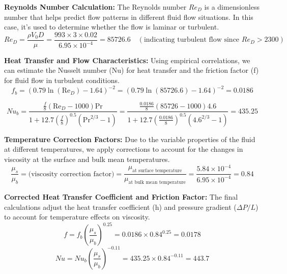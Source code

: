 \documentclass{article}
\numberwithin{equation}{section}
\begin{document}
\textbf{Reynolds Number Calculation:}
The Reynolds number \( Re_D \) is a dimensionless number that helps predict flow patterns in different fluid flow situations. In this case, it's used to determine whether the flow is laminar or turbulent.
\begin{equation}
Re_D = \frac{\rho V_0 D}{\mu} = \frac{993 \times 3 \times 0.02}{6.95 \times 10^{-4}} = 85726.6 \quad (\text{indicating turbulent flow since } Re_D > 2300)
\end{equation}

\textbf{Heat Transfer and Flow Characteristics:}
Using empirical correlations, we can estimate the Nusselt number (Nu) for heat transfer and the friction factor (f) for fluid flow in turbulent conditions.
\begin{equation}
f_b = \left(0.79 \ln(\text{Re}_D) - 1.64\right)^{-2} = \left(0.79 \ln(85726.6) - 1.64\right)^{-2} = 0.0186
\end{equation}

\begin{equation}
Nu_b = \frac{\frac{f}{8}(\text{Re}_D - 1000)\text{Pr}}{1 + 12.7 \left(\frac{f}{8}\right)^{0.5}(\text{Pr}^{2/3} - 1)} = \frac{\frac{0.0186}{8}(85726 - 1000)4.6}{1 + 12.7 \left(\frac{0.0186}{8}\right)^{0.5}(4.6^{2/3} - 1)} = 435.25
\end{equation}

\textbf{Temperature Correction Factors:}
Due to the variable properties of the fluid at different temperatures, we apply corrections to account for the changes in viscosity at the surface and bulk mean temperatures.
\begin{equation}
\frac{\mu_s}{\mu_b} = \text{(viscosity correction factor)} = \frac{\mu_{\text{at surface temperature}}}{\mu_{\text{at bulk mean temperature}}} = \frac{5.84 \times 10^{-4}}{6.95 \times 10^{-4}} = 0.84
\end{equation}

\textbf{Corrected Heat Transfer Coefficient and Friction Factor:}
The final calculations adjust the heat transfer coefficient (h) and pressure gradient (\(\Delta P/L\)) to account for temperature effects on viscosity.
\begin{equation}
f = f_b \left(\frac{\mu_s}{\mu_b}\right)^{0.25} = 0.0186 \times 0.84^{0.25} = 0.0178
\end{equation}
\begin{equation}
Nu = Nu_b \left(\frac{\mu_s}{\mu_b}\right)^{-0.11} = 435.25 \times 0.84^{-0.11} = 443.7
\end{equation}
\end{document}
